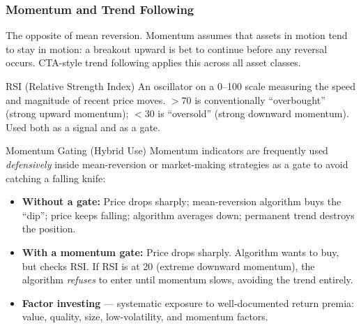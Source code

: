 \subsubsection{Momentum and Trend Following}

The opposite of mean reversion. Momentum assumes that assets in motion tend to stay
in motion: a breakout upward is bet to continue before any reversal occurs.
CTA-style trend following applies this across all asset classes.

\begin{keyterm}{RSI (Relative Strength Index)}
An oscillator on a 0--100 scale measuring the speed and magnitude of recent price
moves. $>70$ is conventionally ``overbought'' (strong upward momentum); $<30$ is
``oversold'' (strong downward momentum). Used both as a signal and as a gate.
\end{keyterm}

\begin{keyterm}{Momentum Gating (Hybrid Use)}
Momentum indicators are frequently used \emph{defensively} inside mean-reversion or
market-making strategies as a gate to avoid catching a falling knife:
\begin{itemize}[noitemsep]
  \item \textbf{Without a gate:} Price drops sharply; mean-reversion algorithm
        buys the ``dip''; price keeps falling; algorithm averages down; permanent
        trend destroys the position.
  \item \textbf{With a momentum gate:} Price drops sharply. Algorithm wants to buy,
        but checks RSI. If RSI is at 20 (extreme downward momentum), the algorithm
        \emph{refuses} to enter until momentum slows, avoiding the trend entirely.
\end{itemize}
\end{keyterm}

\begin{itemize}
  \item \textbf{Factor investing} — systematic exposure to well-documented return
        premia: value, quality, size, low-volatility, and momentum factors.
\end{itemize}

